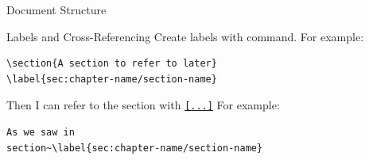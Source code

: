 \documentclass[t]{beamer}
\begin{document}
\begin{frame}{Document Structure}
\end{frame}

\begin{frame}[fragile]{Labels and Cross-Referencing}
  Create labels with \texttt{\label{label-name}} command.
  \vfill
  For example:
  \begin{verbatim}
\section{A section to refer to later}
\label{sec:chapter-name/section-name}
  \end{verbatim}
  \vfill
  Then I can refer to the section with \texttt{\ref{...}}
  \vfill
  For example:
  \begin{verbatim}
As we saw in
section~\label{sec:chapter-name/section-name}
  \end{verbatim}
\end{frame}
\end{document}
